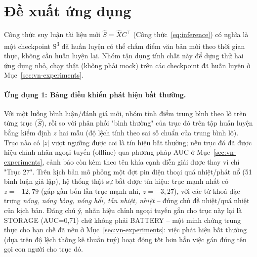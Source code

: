 \documentclass[11pt]{article}
\begin{document}
\section{Đề xuất ứng dụng}
\label{sec:application}

Công thức suy luận tài liệu mới $\hat{S}=\hat{X}C^{\top}$
(Công thức~\ref{eq:inference}) có nghĩa là một checkpoint
S\textsuperscript{3} đã huấn luyện có thể chấm điểm văn bản mới theo thời
gian thực, không cần huấn luyện lại. Nhóm tận dụng tính chất này để dựng
thử hai ứng dụng nhỏ, chạy thật (không phải mock) trên các checkpoint đã
huấn luyện ở Mục~\ref{sec:vn-experiments}.

\paragraph{Ứng dụng 1: Bảng điều khiển phát hiện bất thường.} Với một
luồng bình luận/đánh giá mới, nhóm tính điểm trung bình theo lô trên từng
trục ($\hat{S}$), rồi so với phân phối "bình thường" của trục đó trên tập
huấn luyện bằng kiểm định $z$ hai mẫu (độ lệch tính theo sai số chuẩn của
trung bình lô). Trục nào có $|z|$ vượt ngưỡng được coi là tín hiệu bất
thường; nếu trục đó đã được hiệu chỉnh nhãn ngoại tuyến (offline) qua
phương pháp AUC ở Mục~\ref{sec:vn-experiments}, cảnh báo còn kèm theo tên
khía cạnh diễn giải được thay vì chỉ "Trục 27". Trên kịch bản mô phỏng một
đợt pin điện thoại quá nhiệt/phát nổ (51 bình luận giả lập), hệ thống thật
sự bắt được tín hiệu: trục mạnh nhất có $z=-12{,}79$ (gấp gần bốn lần trục
mạnh nhì, $z=-3{,}27$), với các từ khoá đặc trưng \emph{nóng, nóng bỏng,
nóng hổi, tản nhiệt, nhiệt} -- đúng chủ đề nhiệt/quá nhiệt của kịch bản.
Đáng chú ý, nhãn hiệu chỉnh ngoại tuyến gắn cho trục này lại là STORAGE
(AUC=0,71) chứ không phải BATTERY -- một minh chứng trung thực cho hạn chế
đã nêu ở Mục~\ref{sec:vn-experiments}: việc phát hiện bất thường (dựa trên
độ lệch thống kê thuần tuý) hoạt động tốt hơn hẳn việc gán đúng tên gọi
con người cho trục đó.
\end{document}
